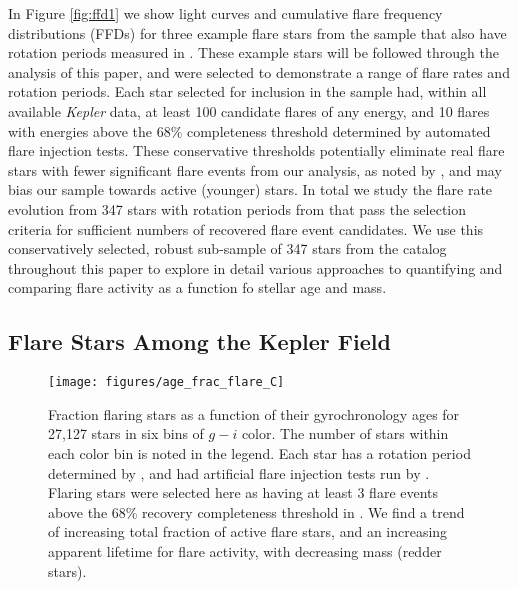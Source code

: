 \documentclass[preprint2]{aastex62}
\newcommand{\Kepler}{\textsl{Kepler}\xspace}
\begin{document}
In Figure \ref{fig:ffd1} we show light curves and cumulative flare frequency distributions (FFDs) for three example flare stars from the \citet{davenport2016} sample that also have rotation periods measured in \citet{mcquillan2014}. These example stars will be followed through the analysis of this paper, and were selected to demonstrate a range of flare rates and rotation periods. 
Each star selected for inclusion in the \citet{davenport2016} sample had, within all available \Kepler data, at least 100 candidate flares of any energy, and 10 flares with energies above the 68\% completeness threshold determined by automated flare injection tests. These conservative thresholds potentially eliminate real flare stars with fewer significant flare events from our analysis, as noted by \citet{van-doorsselaere2017}, and may bias our sample towards active (younger) stars. 
In total we study the flare rate evolution from 347 stars with rotation periods from \citet{mcquillan2014} that pass the \citet{davenport2016} selection criteria for sufficient numbers of recovered flare event candidates. We use this conservatively selected, robust sub-sample of 347 stars from the \citet{davenport2016} catalog throughout this paper to explore in detail various approaches to quantifying and comparing flare activity as a function fo stellar age and mass.



\subsection{Flare Stars Among the Kepler Field}

\begin{figure}[!ht]
\centering
\texttt{[image: figures/age\_frac\_flare\_C]}
\caption{
Fraction flaring stars as a function of their gyrochronology ages for 27,127 stars in six bins of $g-i$ color. The number of stars within each color bin is noted in the legend.
Each star has a rotation period determined by \citet{mcquillan2014}, and had artificial flare injection tests run by \citet{davenport2016}. Flaring stars were selected here as having at least 3 flare events above the 68\% recovery completeness threshold in \citet{davenport2016}. We find a trend of increasing total fraction of active flare stars, and an increasing apparent lifetime for flare activity, with decreasing mass (redder stars).
}
\label{fig:fracactive}
\end{figure}
\end{document}
